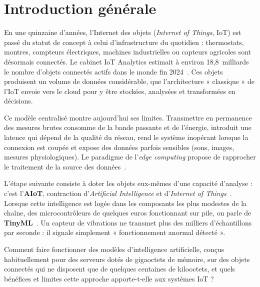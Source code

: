 \chapter*{Introduction générale}

En une quinzaine d'années, l'Internet des objets (\emph{Internet of Things}, IoT)
est passé du statut de concept à celui d'infrastructure du quotidien :
thermostats, montres, compteurs électriques, machines industrielles ou capteurs
agricoles sont désormais connectés. Le cabinet IoT Analytics estimait à environ
18,8~milliards le nombre d'objets connectés actifs dans le monde fin
2024~\cite{iotanalytics2024}. Ces objets produisent un volume de données
considérable, que l'architecture « classique » de l'IoT envoie vers le cloud pour
y être stockées, analysées et transformées en décisions.

Ce modèle centralisé montre aujourd'hui ses limites. Transmettre en permanence
des mesures brutes consomme de la bande passante et de l'énergie, introduit une
latence qui dépend de la qualité du réseau, rend le système inopérant lorsque la
connexion est coupée et expose des données parfois sensibles (sons, images,
mesures physiologiques). Le paradigme de l'\emph{edge computing} propose de
rapprocher le traitement de la source des données~\cite{shi2016edge}.

L'étape suivante consiste à doter les objets eux-mêmes d'une capacité
d'analyse : c'est l'\textbf{AIoT}, contraction d'\emph{Artificial Intelligence}
et d'\emph{Internet of Things}~\cite{zhang2021aiot}. Lorsque cette intelligence
est logée dans les composants les plus modestes de la chaîne, des
microcontrôleurs de quelques euros fonctionnant sur pile, on parle de
\textbf{TinyML}~\cite{warden2019tinyml,banbury2020benchmarking}. Un capteur
de vibrations ne transmet plus des milliers d'échantillons par seconde : il
signale simplement « fonctionnement anormal détecté ».

\begin{encadre}[title={Problématique}]
Comment faire fonctionner des modèles d'intelligence artificielle, conçus
habituellement pour des serveurs dotés de gigaoctets de mémoire, sur des objets
connectés qui ne disposent que de quelques centaines de kilooctets, et quels
bénéfices et limites cette approche apporte-t-elle aux systèmes IoT ?
\end{encadre}

